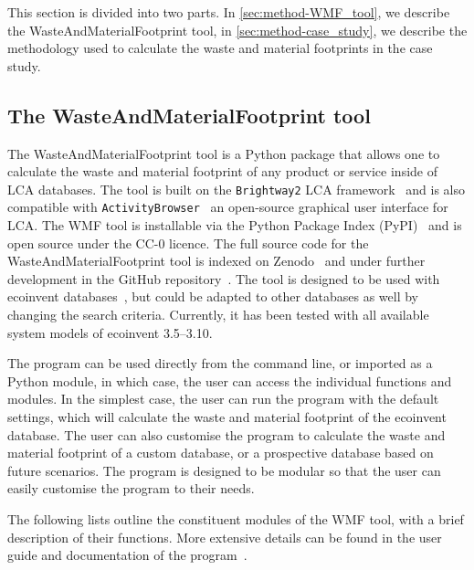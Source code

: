 This section is divided into two parts. In \autoref{sec:method-WMF_tool}, we describe the WasteAndMaterialFootprint tool, in \autoref{sec:method-case_study}, we describe the methodology used to calculate the waste and material footprints in the case study.

\subsection{The WasteAndMaterialFootprint tool}
\label{sec:method-WMF_tool}

The WasteAndMaterialFootprint tool is a Python package that allows one to calculate the waste and material footprint of any product or service inside of LCA databases. The tool is built on the \texttt{Brightway2} LCA framework~\citep{mutel2017brightway} and is also compatible with \texttt{ActivityBrowser}~\citep{steubing2020activitybrowser} an open-source graphical user interface for LCA. The WMF tool is installable via the Python Package Index (PyPI)~\citep{mcdowall2023wmfpipy} and is open source under the CC-0 licence. The full source code for the WasteAndMaterialFootprint tool is indexed on Zenodo~\citep{mcdowall2023wmfzenodo} and under further development in the GitHub repository~\citep{mcdowall2024wmfgithub}. The tool is designed to be used with ecoinvent databases~\citep{ecoinvent2016version3}, but could be adapted to other databases as well by changing the search criteria. Currently, it has been tested with all available system models of ecoinvent 3.5--3.10.

The program can be used directly from the command line, or imported as a Python module, in which case, the user can access the individual functions and modules. In the simplest case, the user can run the program with the default settings, which will calculate the waste and material footprint of the ecoinvent database. The user can also customise the program to calculate the waste and material footprint of a custom database, or a prospective database based on future scenarios. The program is designed to be modular so that the user can easily customise the program to their needs.

The following lists outline the constituent modules of the WMF tool, with a brief description of their functions. More extensive details can be found in the user guide and documentation of the program~\citep{mcdowall2023wmfdocs}.

